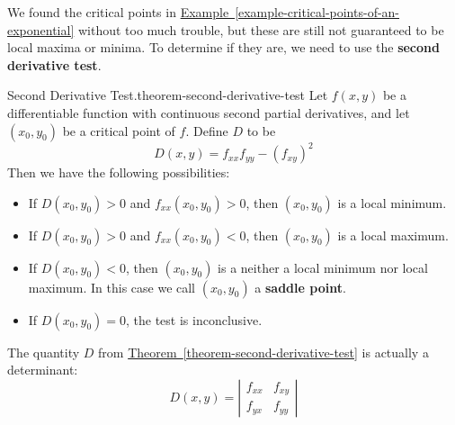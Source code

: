 \documentclass[10pt,]{book}
\newcommand{\terminology}[1]{\textbf{#1}}
\numberwithin{equation}{section}
\begin{document}
\hypertarget{p-1423}{}%
We found the critical points in \hyperref[example-critical-points-of-an-exponential]{Example~\ref{example-critical-points-of-an-exponential}} without too much trouble, but these are still not guaranteed to be local maxima or minima. To determine if they are, we need to use the \terminology{second derivative test}.%
\begin{theorem}{Second Derivative Test.}{}{theorem-second-derivative-test}%
\hypertarget{p-1424}{}%
Let \(f(x,y)\) be a differentiable function with continuous second partial derivatives, and let \((x_{0},y_{0})\) be a critical point of \(f\). Define \(D\) to be%
\begin{equation*}
D(x,y) = f_{xx}f_{yy} - (f_{xy})^{2}
\end{equation*}
Then we have the following possibilities: \leavevmode%
\begin{itemize}[label=\textbullet]
\item{}If \(D(x_{0},y_{0}) > 0 \) and \(f_{xx}(x_{0},y_{0}) > 0\), then \((x_{0},y_{0})\) is a local minimum.%
\item{}If \(D(x_{0},y_{0}) > 0 \) and \(f_{xx}(x_{0},y_{0}) < 0\), then \((x_{0},y_{0})\) is a local maximum.%
\item{}If \(D(x_{0},y_{0}) < 0 \), then \((x_{0},y_{0})\) is a neither a local minimum nor local maximum. In this case we call \((x_{0},y_{0})\) a \terminology{saddle point}.%
\item{}If \(D(x_{0},y_{0}) = 0 \), the test is inconclusive.%
\end{itemize}
%
\end{theorem}
\hypertarget{p-1425}{}%
The quantity \(D\) from \hyperref[theorem-second-derivative-test]{Theorem~\ref{theorem-second-derivative-test}} is actually a determinant:%
\begin{equation*}
D(x,y) = \left|\begin{array}{cc} f_{xx} & f_{xy} \\ f_{yx} & f_{yy}\end{array}\right|
\end{equation*}
%
\end{document}
